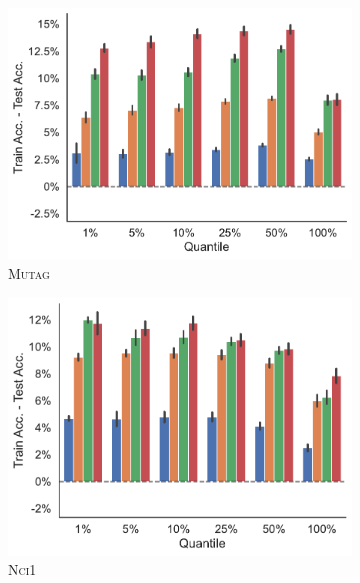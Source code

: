 \begin{figure}[!htb]
\begin{subfigure}[b]{0.3\textwidth}
		\centering
		\includegraphics[width=\textwidth]{Figures/train_test_diff_k_wl_MUTAG.pdf}
		\vspace*{-4ex} 
		\caption{\textsc{Mutag}}
	\end{subfigure}
	\par\bigskip
	\begin{subfigure}[b]{0.3\textwidth}
		\centering
		\includegraphics[width=\textwidth]{Figures/train_test_diff_k_wl_NCI1.pdf}
		\vspace*{-4ex} 
		\caption{\textsc{Nci1}}
	\end{subfigure}
	\hfill
	\begin{subfigure}[b]{0.3\textwidth}
		\centering

\end{subfigure}
\end{figure}
